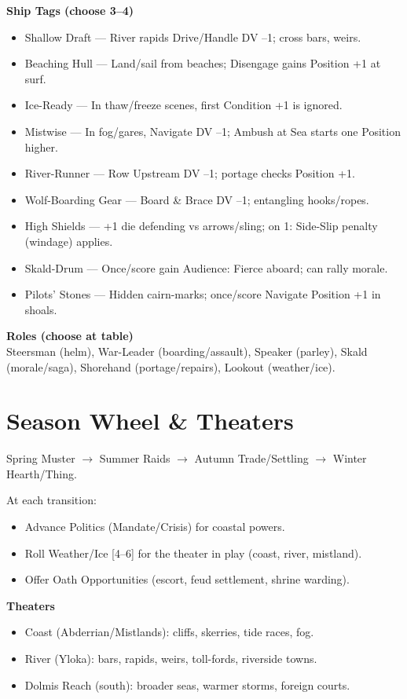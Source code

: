 \documentclass[11pt]{article}
\begin{document}
\textbf{Ship Tags (choose 3--4)}
\begin{itemize}
\item Shallow Draft --- River rapids Drive/Handle DV --1; cross bars, weirs.
\item Beaching Hull --- Land/sail from beaches; Disengage gains Position +1 at surf.
\item Ice-Ready --- In thaw/freeze scenes, first Condition +1 is ignored.
\item Mistwise --- In fog/gares, Navigate DV --1; Ambush at Sea starts one Position higher.
\item River-Runner --- Row Upstream DV --1; portage checks Position +1.
\item Wolf-Boarding Gear --- Board \& Brace DV --1; entangling hooks/ropes.
\item High Shields --- +1 die defending vs arrows/sling; on 1: Side-Slip penalty (windage) applies.
\item Skald-Drum --- Once/score gain Audience: Fierce aboard; can rally morale.
\item Pilots' Stones --- Hidden cairn-marks; once/score Navigate Position +1 in shoals.
\end{itemize}

\textbf{Roles (choose at table)}\\
Steersman (helm), War-Leader (boarding/assault), Speaker (parley), Skald (morale/saga), Shorehand (portage/repairs), Lookout (weather/ice).

\section{Season Wheel \& Theaters}

Spring Muster $\rightarrow$ Summer Raids $\rightarrow$ Autumn Trade/Settling $\rightarrow$ Winter Hearth/Thing.

At each transition:
\begin{itemize}
\item Advance Politics (Mandate/Crisis) for coastal powers.
\item Roll Weather/Ice [4--6] for the theater in play (coast, river, mistland).
\item Offer Oath Opportunities (escort, feud settlement, shrine warding).
\end{itemize}

\textbf{Theaters}
\begin{itemize}
\item Coast (Abderrian/Mistlands): cliffs, skerries, tide races, fog.
\item River (Yloka): bars, rapids, weirs, toll-fords, riverside towns.
\item Dolmis Reach (south): broader seas, warmer storms, foreign courts.
\end{itemize}
\end{document}
